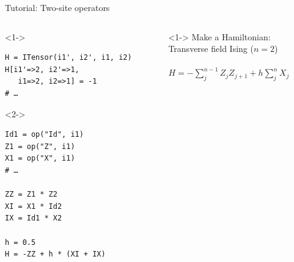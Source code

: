 \begin{frame}[fragile]{Tutorial: Two-site operators}

\begin{columns}

\begin{column}{4.5cm}

\begin{onlyenv}<1->
\begin{lstlisting}[language=JuliaLocal, style=julia, basicstyle=\small]
H = ITensor(i1', i2', i1, i2)
H[i1'=>2, i2'=>1,
   i1=>2, i2=>1] = -1
# …
\end{lstlisting}
\end{onlyenv}

\begin{onlyenv}<2->
\begin{lstlisting}[language=JuliaLocal, style=julia, basicstyle=\small]
Id1 = op("Id", i1)
Z1 = op("Z", i1)
X1 = op("X", i1)
# …

ZZ = Z1 * Z2
XI = X1 * Id2
IX = Id1 * X2

h = 0.5
H = -ZZ + h * (XI + IX)
\end{lstlisting}
\end{onlyenv}

\end{column}

\begin{column}{5.5cm}

\begin{onlyenv}<1->
Make a Hamiltonian: \\
Transverse field Ising ($n=2$) \\
~\\
$H = -\sum_j^{n-1} Z_j Z_{j+1} + h \sum_j^n X_j$
\end{onlyenv}



\end{column}
\end{columns}
\end{frame}
